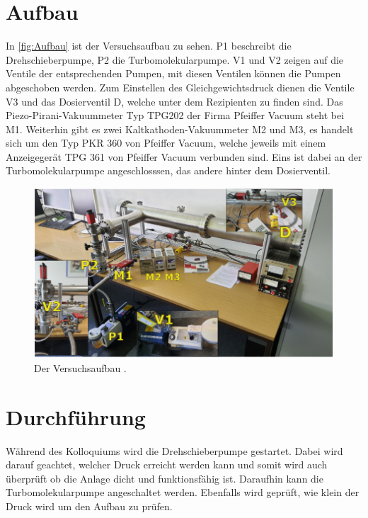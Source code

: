     \section{Aufbau}
        In \autoref{fig:Aufbau} ist der Versuchsaufbau zu sehen.
        P1 beschreibt die Drehschieberpumpe, P2 die Turbomolekularpumpe.
        V1 und V2 zeigen auf die Ventile der entsprechenden Pumpen, mit diesen Ventilen können die Pumpen abgeschoben werden.
        Zum Einstellen des Gleichgewichtsdruck dienen die Ventile V3 und das Dosierventil D, welche unter dem Rezipienten zu finden sind.
        Das Piezo-Pirani-Vakuummeter Typ TPG202 der Firma Pfeiffer Vacuum steht bei M1.
        Weiterhin gibt es zwei Kaltkathoden-Vakuummeter M2 und M3, es handelt sich um den Typ PKR 360 von Pfeiffer Vacuum, welche jeweils mit einem Anzeigegerät TPG 361 
        von Pfeiffer Vacuum verbunden sind.
        Eins ist dabei an der Turbomolekularpumpe angeschlosssen, das andere hinter dem Dosierventil.

        \begin{figure}[H]
            \centering
            \includegraphics[width=\textwidth]{bilder/Aufbau.png}
            \caption{Der Versuchsaufbau \cite{anleitung}.}
            \label{fig:Aufbau}
        \end{figure}

    \section{Durchführung}
    \label{sec:Durchführung}
        Während des Kolloquiums wird die Drehschieberpumpe gestartet.
        Dabei wird darauf geachtet, welcher Druck erreicht werden kann und somit wird auch überprüft ob die Anlage dicht und funktionsfähig ist.
        Daraufhin kann die Turbomolekularpumpe angeschaltet werden.
        Ebenfalls wird geprüft, wie klein der Druck wird um den Aufbau zu prüfen.

